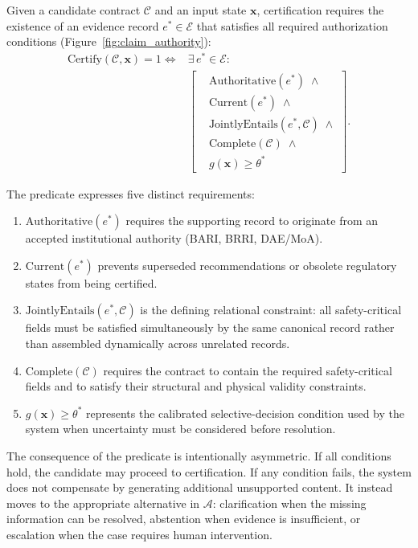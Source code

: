 \documentclass[a4paper,fleqn]{cas-dc}
\begin{document}
Given a candidate contract $\mathcal{C}$ and an input state $\mathbf{x}$, certification requires the existence of an evidence record $e^*\in\mathcal{E}$ that satisfies all required authorization conditions (Figure~\ref{fig:claim_authority}):
\begin{equation}
\label{eq:certification_rule}
\begin{aligned}
\mathrm{Certify}(\mathcal{C},\mathbf{x}) = 1 \iff {} & \exists\, e^*\in\mathcal{E} : \\
& \left[
\begin{aligned}
& \mathrm{Authoritative}(e^*) \;\land \\
& \mathrm{Current}(e^*) \;\land \\
& \mathrm{JointlyEntails}(e^*,\mathcal{C}) \;\land \\
& \mathrm{Complete}(\mathcal{C}) \;\land \\
& g(\mathbf{x})\geq\theta^*
\end{aligned}
\right].
\end{aligned}
\end{equation}

The predicate expresses five distinct requirements:
\begin{enumerate}
    \item[\textbf{(i)}] $\mathrm{Authoritative}(e^*)$ requires the supporting record to originate from an accepted institutional authority (BARI, BRRI, DAE/MoA).
    \item[\textbf{(ii)}] $\mathrm{Current}(e^*)$ prevents superseded recommendations or obsolete regulatory states from being certified.
    \item[\textbf{(iii)}] $\mathrm{JointlyEntails}(e^*,\mathcal{C})$ is the defining relational constraint: all safety-critical fields must be satisfied simultaneously by the same canonical record rather than assembled dynamically across unrelated records.
    \item[\textbf{(iv)}] $\mathrm{Complete}(\mathcal{C})$ requires the contract to contain the required safety-critical fields and to satisfy their structural and physical validity constraints.
    \item[\textbf{(v)}] $g(\mathbf{x})\geq\theta^*$ represents the calibrated selective-decision condition used by the system when uncertainty must be considered before resolution.
\end{enumerate}

The consequence of the predicate is intentionally asymmetric. If all conditions hold, the candidate may proceed to certification. If any condition fails, the system does not compensate by generating additional unsupported content. It instead moves to the appropriate alternative in $\mathcal{A}$: clarification when the missing information can be resolved, abstention when evidence is insufficient, or escalation when the case requires human intervention.
\end{document}
